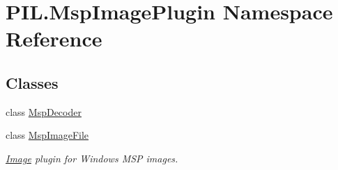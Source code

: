 \hypertarget{namespacePIL_1_1MspImagePlugin}{}\section{P\+I\+L.\+Msp\+Image\+Plugin Namespace Reference}
\label{namespacePIL_1_1MspImagePlugin}
\subsection*{Classes}
\begin{DoxyCompactItemize}
\item 
class \hyperlink{classPIL_1_1MspImagePlugin_1_1MspDecoder}{Msp\+Decoder}
\item 
class \hyperlink{classPIL_1_1MspImagePlugin_1_1MspImageFile}{Msp\+Image\+File}
\begin{DoxyCompactList}\small\item\em \hyperlink{namespacePIL_1_1Image}{Image} plugin for Windows M\+SP images. \end{DoxyCompactList}\end{DoxyCompactItemize}
